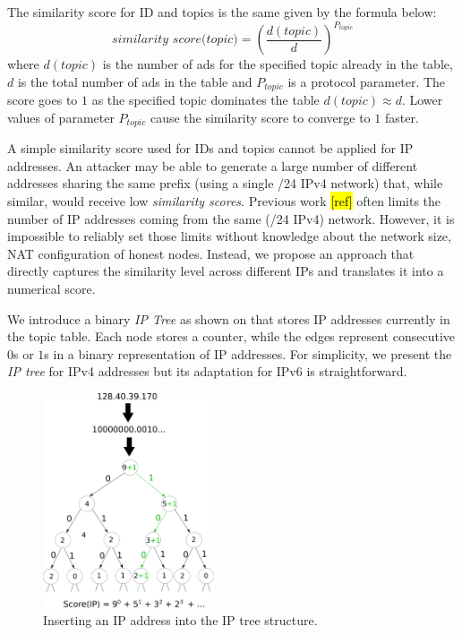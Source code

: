 The similarity score for ID and topics is the same given by the formula below:
\begin{equation}
    \textit{similarity score(topic)}= (\frac{d(topic)}{d})^{P_{topic}} 
\end{equation}
where $d(topic)$ is the number of ads for the specified topic already in the table, $d$ is the total number of ads in the table and $P_{topic}$ is a protocol parameter. The score goes to $1$ as the specified topic dominates the table $d(topic)  \approx  d$. Lower values of parameter $P_{topic}$ cause the similarity score to converge to $1$ faster. 

A simple similarity score used for IDs and topics cannot be applied for IP addresses. An attacker may be able to generate a large number of different addresses sharing the same prefix (\eg using a single /24 IPv4 network) that, while similar, would receive low \emph{similarity scores}. Previous work \hl{[ref]} often limits the number of IP addresses coming from the same (\eg /24 IPv4) network. However, it is impossible to reliably set those limits without knowledge about the network size, NAT configuration of honest nodes. Instead, we propose an approach that directly captures the similarity level across different IPs and translates it into a numerical score. 

We introduce a binary \emph{IP Tree} as shown on  that stores IP addresses currently in the topic table. Each node stores a counter, while the edges represent consecutive $0$s or $1$s in a binary representation of IP addresses. For simplicity, we present the \emph{IP tree} for IPv4 addresses but its adaptation for IPv6 is straightforward. 

\begin{figure}
    \includegraphics[width=0.45\textwidth]{img/ip_tree}
    \caption{Inserting an IP address into the IP tree structure.}
    \label{fig:ip_tree}
\end{figure}

